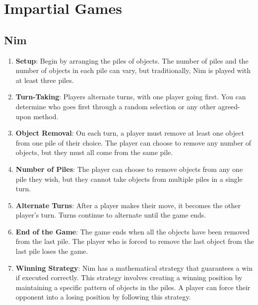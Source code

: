 \documentclass[12pt,oneside]{book}
\begin{document}
\chapter{Impartial Games}
\section{Nim}


\begin{enumerate}
    \item \textbf{Setup}: Begin by arranging the piles of objects. The number of piles and the number of objects in each pile can vary, but traditionally, Nim is played with at least three piles.
  
    \item \textbf{Turn-Taking}: Players alternate turns, with one player going first. You can determine who goes first through a random selection or any other agreed-upon method.
  
    \item \textbf{Object Removal}: On each turn, a player must remove at least one object from one pile of their choice. The player can choose to remove any number of objects, but they must all come from the same pile.
  
    \item \textbf{Number of Piles}: The player can choose to remove objects from any one pile they wish, but they cannot take objects from multiple piles in a single turn.
  
    \item \textbf{Alternate Turns}: After a player makes their move, it becomes the other player's turn. Turns continue to alternate until the game ends.
  
    \item \textbf{End of the Game}: The game ends when all the objects have been removed from the last pile. The player who is forced to remove the last object from the last pile loses the game.
  
    \item \textbf{Winning Strategy}: Nim has a mathematical strategy that guarantees a win if executed correctly. This strategy involves creating a winning position by maintaining a specific pattern of objects in the piles. A player can force their opponent into a losing position by following this strategy.
  \end{enumerate}
\end{document}
